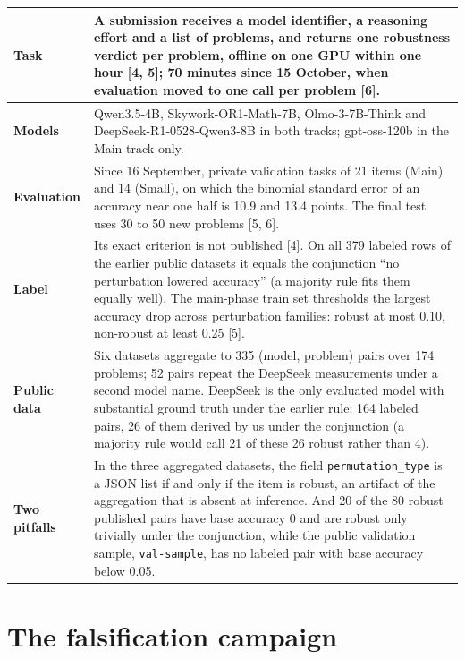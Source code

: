 \documentclass{article}
\begin{document}
\begin{center}
\small
\begin{tabular}{@{}L{2.1cm}L{11.3cm}@{}}
\toprule
\textbf{Task} & A submission receives a model identifier, a reasoning effort and a list of problems, and returns one robustness verdict per problem, offline on one GPU within one hour [4, 5]; 70 minutes since 15 October, when evaluation moved to one call per problem [6]. \\
\midrule
\textbf{Models} & Qwen3.5-4B, Skywork-OR1-Math-7B, Olmo-3-7B-Think and DeepSeek-R1-0528-Qwen3-8B in both tracks; gpt-oss-120b in the Main track only. \\
\midrule
\textbf{Evaluation} & Since 16 September, private validation tasks of 21 items (Main) and 14 (Small), on which the binomial standard error of an accuracy near one half is 10.9 and 13.4 points. The final test uses 30 to 50 new problems [5, 6]. \\
\midrule
\textbf{Label} & Its exact criterion is not published [4]. On all 379 labeled rows of the earlier public datasets it equals the conjunction ``no perturbation lowered accuracy'' (a majority rule fits them equally well). The main-phase train set thresholds the largest accuracy drop across perturbation families: robust at most 0.10, non-robust at least 0.25 [5]. \\
\midrule
\textbf{Public data} & Six datasets aggregate to 335 (model, problem) pairs over 174 problems; 52 pairs repeat the DeepSeek measurements under a second model name. DeepSeek is the only evaluated model with substantial ground truth under the earlier rule: 164 labeled pairs, 26 of them derived by us under the conjunction (a majority rule would call 21 of these 26 robust rather than 4). \\
\midrule
\textbf{Two pitfalls} & In the three aggregated datasets, the field \texttt{permutation\_type} is a JSON list if and only if the item is robust, an artifact of the aggregation that is absent at inference. And 20 of the 80 robust published pairs have base accuracy 0 and are robust only trivially under the conjunction, while the public validation sample, \texttt{val-sample}, has no labeled pair with base accuracy below 0.05. \\
\bottomrule
\end{tabular}
\end{center}

\section{The falsification campaign}\label{sec:3}
\end{document}
